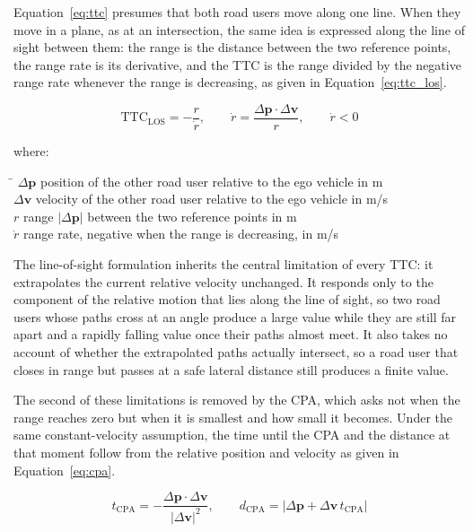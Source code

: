 Equation~\eqref{eq:ttc} presumes that both road users move along one line. When they
move in a plane, as at an intersection, the same idea is expressed along the line of
sight between them: the range is the distance between the two reference points, the
range rate is its derivative, and the \ac{TTC} is the range divided by the negative
range rate whenever the range is decreasing, as given in Equation~\eqref{eq:ttc_los}.

\begin{equation}
    \mathrm{TTC}_\mathrm{LOS} = -\frac{r}{\dot{r}}, \qquad
    \dot{r} = \frac{\Delta\mathbf{p} \cdot \Delta\mathbf{v}}{r}, \qquad \dot{r} < 0
    \label{eq:ttc_los}
\end{equation}

where:\nopagebreak
\begin{tabbing}
    \hspace{2.2cm} \= \kill
    $\Delta\mathbf{p}$ \> position of the other road user relative to the ego vehicle in m \\
    $\Delta\mathbf{v}$ \> velocity of the other road user relative to the ego vehicle in m/s \\
    $r$ \> range $\lvert \Delta\mathbf{p} \rvert$ between the two reference points in m \\
    $\dot{r}$ \> range rate, negative when the range is decreasing, in m/s
\end{tabbing}

The line-of-sight formulation inherits the central limitation of every \ac{TTC}: it
extrapolates the current relative velocity unchanged. It responds only to the
component of the relative motion that lies along the line of sight, so two road users
whose paths cross at an angle produce a large value while they are still far apart and
a rapidly falling value once their paths almost meet. It also takes no account of
whether the extrapolated paths actually intersect, so a road user that closes in range
but passes at a safe lateral distance still produces a finite value.

The second of these limitations is removed by the \ac{CPA}, which
asks not when the range reaches zero but when it is smallest and how small it becomes.
Under the same constant-velocity assumption, the time until the \ac{CPA} and the
distance at that moment follow from the relative position and velocity as given in
Equation~\eqref{eq:cpa}.

\begin{equation}
    t_\mathrm{CPA} = -\frac{\Delta\mathbf{p} \cdot \Delta\mathbf{v}}{\lvert \Delta\mathbf{v} \rvert^{2}},
    \qquad
    d_\mathrm{CPA} = \left\lvert \Delta\mathbf{p} + \Delta\mathbf{v}\, t_\mathrm{CPA} \right\rvert
    \label{eq:cpa}
\end{equation}

